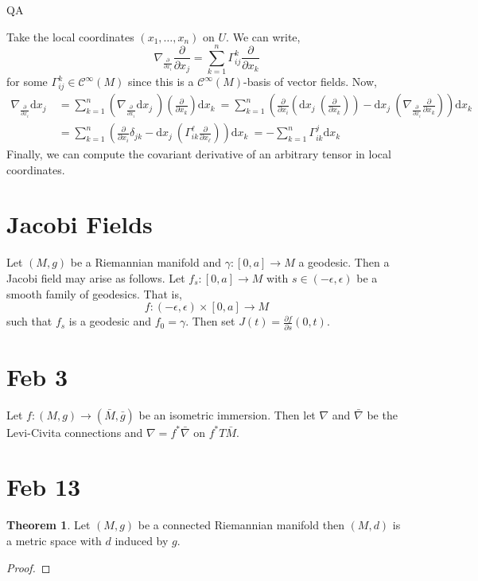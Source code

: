 QA	 \documentclass[12pt]{extarticle}
\renewcommand{\d}[1]{ \mathrm{d}#1 \:}
\newcommand{\pderiv}[2]{\frac{\partial{#1}}{\partial{#2}}}
\theoremstyle{definition}
\newtheorem{theorem}{Theorem}[section]
\newcommand{\C}[1]{\mathcal{C}^{#1}}
\begin{document}
Take the local coordinates $(x_1, \dots, x_n)$ on $U$. We can write,
\[ \nabla_{\pderiv{}{x_i}} \pderiv{}{x_j} = \sum_{k = 1}^n \Gamma_{ij}^k \pderiv{}{x_k} \]
for some $\Gamma_{ij}^k \in \C{\infty}(M)$ since this is a $\C{\infty}(M)$-basis of vector fields. Now,
\begin{align*}
\nabla_{\pderiv{}{x_i}} \d{x_j} & = \sum_{k = 1}^n \left( \nabla_{\pderiv{}{x_i}} \d{x_j} \right) \left( \pderiv{}{x_k} \right) \d{x_k} = \sum_{k = 1}^n \left( \pderiv{}{x_i} \left( \d{x_j} \left( \pderiv{}{x_k} \right) \right) - \d{x_j} \left( \nabla_{\pderiv{}{x_i}} \pderiv{}{x_k} \right) \right) \d{x_k}
\\
& =  \sum_{k = 1}^n \left( \pderiv{}{x_i} \delta_{jk} - \d{x_j} \left( \Gamma_{ik}^\ell \pderiv{}{x_\ell} \right) \right) \d{x_k} = - \sum_{k = 1}^n \Gamma_{ik}^j \d{x_k} 
\end{align*}
Finally, we can compute the covariant derivative of an arbitrary tensor in local coordinates.


\section{Jacobi Fields}

Let $(M, g)$ be a Riemannian manifold and $\gamma : [0, a] \to M$ a geodesic. Then a Jacobi field may arise as follows. Let $f_s : [0, a] \to M$ with $s \in (-\epsilon, \epsilon)$ be a smooth family of geodesics. That is,
\[ f : (-\epsilon, \epsilon) \times [0, a] \to M \]
such that $f_s$ is a geodesic and $f_0 = \gamma$. Then set $J(t) = \pderiv{f}{s}(0, t)$. 


\section{Feb 3}

Let $f : (M, g) \to (\bar{M}, \bar{g})$ be an isometric immersion. Then let $\nabla$ and $\bar{\nabla}$ be the Levi-Civita connections and $\nabla = f^* \bar{\nabla}$ on $f^* T\bar{M}$. 


\section{Feb 13}

\begin{theorem}
Let $(M, g)$ be a connected Riemannian manifold then $(M, d)$ is a metric space with $d$ induced by $g$.
\end{theorem}

\begin{proof}

\end{proof}
\end{document}
